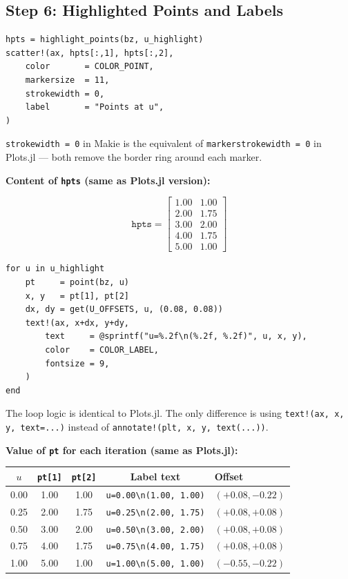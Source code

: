 \documentclass[12pt, a4paper]{article}
\newcommand{\cd}[1]{\texttt{#1}}
\begin{document}
\subsection{Step 6: Highlighted Points and Labels}

\begin{verbatim}
hpts = highlight_points(bz, u_highlight)
scatter!(ax, hpts[:,1], hpts[:,2],
    color       = COLOR_POINT,
    markersize  = 11,
    strokewidth = 0,
    label       = "Points at u",
)
\end{verbatim}

\cd{strokewidth = 0} in Makie is the equivalent of
\cd{markerstrokewidth = 0} in Plots.jl ---
both remove the border ring around each marker.

\begin{examplebox}
\textbf{Content of \cd{hpts} (same as Plots.jl version):}

\[
  \cd{hpts} =
  \begin{bmatrix}
    1.00 & 1.00 \\
    2.00 & 1.75 \\
    3.00 & 2.00 \\
    4.00 & 1.75 \\
    5.00 & 1.00
  \end{bmatrix}
\]
\end{examplebox}

\begin{verbatim}
for u in u_highlight
    pt     = point(bz, u)
    x, y   = pt[1], pt[2]
    dx, dy = get(U_OFFSETS, u, (0.08, 0.08))
    text!(ax, x+dx, y+dy,
        text     = @sprintf("u=%.2f\n(%.2f, %.2f)", u, x, y),
        color    = COLOR_LABEL,
        fontsize = 9,
    )
end
\end{verbatim}

The loop logic is identical to Plots.jl.
The only difference is using \cd{text!(ax, x, y, text=...)}
instead of \cd{annotate!(plt, x, y, text(...))}.

\begin{examplebox}
\textbf{Value of \cd{pt} for each iteration (same as Plots.jl):}

\medskip
\begin{tabular}{ccccl}
\toprule
$u$ & \cd{pt[1]} & \cd{pt[2]} & Label text & Offset \\
\midrule
0.00 & 1.00 & 1.00 & \cd{u=0.00\textbackslash n(1.00, 1.00)} & $(+0.08,-0.22)$ \\
0.25 & 2.00 & 1.75 & \cd{u=0.25\textbackslash n(2.00, 1.75)} & $(+0.08,+0.08)$ \\
0.50 & 3.00 & 2.00 & \cd{u=0.50\textbackslash n(3.00, 2.00)} & $(+0.08,+0.08)$ \\
0.75 & 4.00 & 1.75 & \cd{u=0.75\textbackslash n(4.00, 1.75)} & $(+0.08,+0.08)$ \\
1.00 & 5.00 & 1.00 & \cd{u=1.00\textbackslash n(5.00, 1.00)} & $(-0.55,-0.22)$ \\
\bottomrule
\end{tabular}
\end{examplebox}
\end{document}
